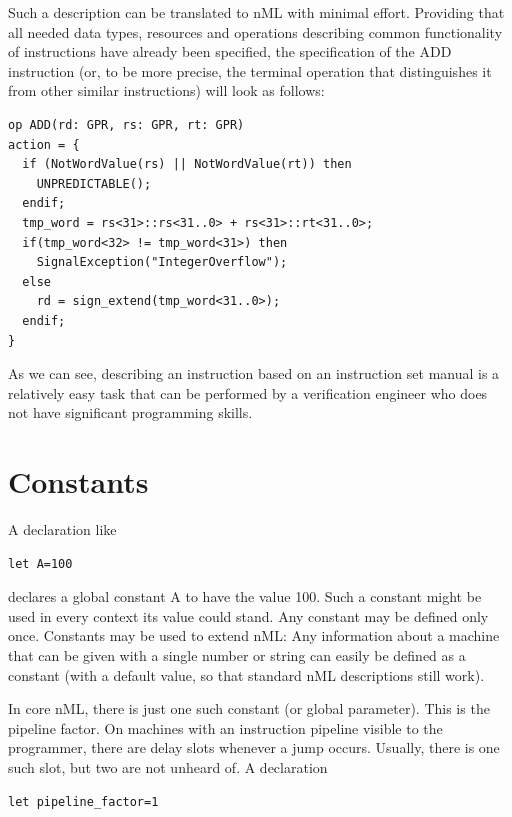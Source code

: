 \documentclass[oneside,final,14pt]{extreport}
\begin{document}
Such a description can be translated to nML with minimal effort. Providing that
all needed data types, resources and operations describing common functionality
of instructions have already been specified, the specification of the ADD
instruction (or, to be more precise, the terminal operation that distinguishes 
it from other similar instructions) will look as follows:

\begin{lstlisting}
op ADD(rd: GPR, rs: GPR, rt: GPR)
action = {
  if (NotWordValue(rs) || NotWordValue(rt)) then
    UNPREDICTABLE();
  endif;
  tmp_word = rs<31>::rs<31..0> + rs<31>::rt<31..0>;
  if(tmp_word<32> != tmp_word<31>) then
    SignalException("IntegerOverflow");
  else
    rd = sign_extend(tmp_word<31..0>);
  endif;
}
\end{lstlisting}

As we can see, describing an instruction based on an instruction set manual is
a relatively easy task that can be performed by a verification engineer who
does not have significant programming skills.


\section{Constants}

A declaration like

\begin{lstlisting}
let A=100
\end{lstlisting}

declares a global constant A to have the value 100. Such a constant might be used in every context
its value could stand. Any constant may be defined only once. Constants may be used to extend nML:
Any information about a machine that can be given with a single number or string can easily be
defined as a constant (with a default value, so that standard nML descriptions still work).

In core nML, there is just one such constant (or global parameter).
This is the pipeline factor. On machines with an instruction pipeline visible to the programmer,
there are delay slots whenever a jump occurs. Usually, there is one such slot, but two are not
unheard of. A declaration

\begin{lstlisting}
let pipeline_factor=1
\end{lstlisting}
\end{document}
